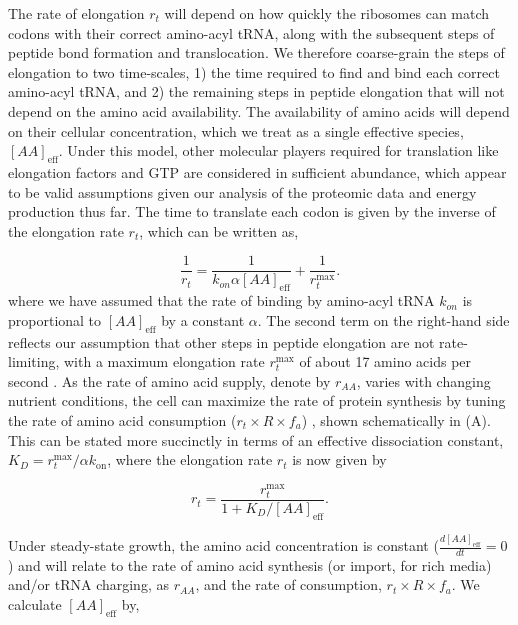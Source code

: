 The rate of elongation $r_t$ will depend on how quickly the ribosomes can match
codons with their correct amino-acyl tRNA, along with the subsequent steps of
peptide bond formation and translocation. We therefore coarse-grain the steps of
elongation to two time-scales,  1) the time required to find and bind each
correct amino-acyl tRNA, and 2) the remaining steps in peptide elongation that
will not depend on the amino acid availability. The availability of amino acids
will depend on their cellular concentration, which we treat as a single
effective species, $[AA]_\text{eff}$. Under this model, other molecular players
required for translation like elongation factors and GTP are considered in
sufficient abundance, which appear to be valid assumptions given our analysis of
the proteomic data and energy production thus far. The time to translate each
codon is given by the inverse of the elongation rate $r_t$, which can be written
as,

\begin{equation}
\frac{1}{r_t} = \frac{1}{k_{on} \alpha [AA]_{\text{eff}}} + \frac{1}{r_{t}^{\text{max}}}.
\end{equation}
where we have assumed that the rate of binding by amino-acyl tRNA $k_{on}$ is
proportional to $[AA]_{\text{eff}}$ by a constant $\alpha$. The second term on
the right-hand side reflects our assumption that other steps in peptide
elongation are not rate-limiting, with a maximum elongation rate
$r_{t}^{\text{max}}$ of about 17 amino acids per second \cite{dai2016}. As the
rate of amino acid supply, denote by $r_{AA}$, varies with changing nutrient
conditions, the cell can maximize the rate of protein synthesis by tuning the
rate of amino acid consumption ($r_t \times R \times f_a$) ,
shown schematically in (A). This can be stated more
succinctly in terms of an effective dissociation constant, $K_D = r_{t}^{\text{max}} / \alpha k_\text{on}$, where the elongation rate $r_t$ is now given by

\begin{equation}
r_t = \frac{r_{t}^{\text{max}}}{1 + K_D/[AA]_{\text{eff}}}.
\label{eq:rt_kd_simple}
\end{equation}

Under steady-state growth, the amino acid concentration is constant
($\frac{d[AA]_\text{eff}}{dt}=0$) and will relate to the rate of amino acid
synthesis (or import, for rich media) and/or tRNA charging, as $r_{AA}$, and the
rate of consumption, $r_t\times R \times f_a$. We calculate
$[AA]_\text{eff}$ by,

